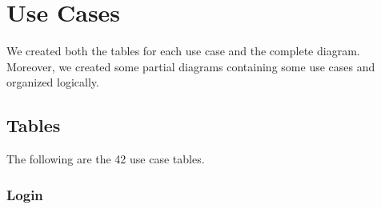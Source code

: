 \section{Use Cases} \label{usecases}
\renewcommand{\labelenumii}{\arabic{enumi}.\arabic{enumii}}

We created both the tables for each use case and the complete diagram. Moreover, we created some partial diagrams containing some use cases and organized logically.

\subsection{Tables}
The following are the 42 use case tables.

\subsubsection{Login}
